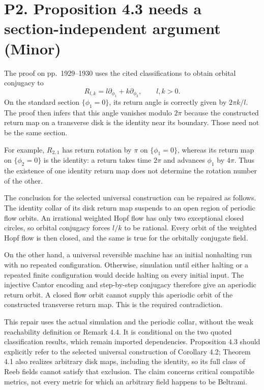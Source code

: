\documentclass[10pt]{article}
\begin{document}
\section*{P2. Proposition 4.3 needs a section-independent argument (Minor)}
The proof on pp. 1929–1930 uses the cited classifications to obtain orbital conjugacy to \[R_{l,k}=l\partial_{\phi_1}+k\partial_{\phi_2},\qquad l,k>0.\] On the standard section \(\{\phi_1=0\}\), its return angle is correctly given by \(2\pi k/l\). The proof then infers that this angle vanishes modulo \(2\pi\) because the constructed return map on a transverse disk is the identity near its boundary. Those need not be the same section.\par
For example, \(R_{2,1}\) has return rotation by \(\pi\) on \(\{\phi_1=0\}\), whereas its return map on \(\{\phi_2=0\}\) is the identity: a return takes time \(2\pi\) and advances \(\phi_1\) by \(4\pi\). Thus the existence of one identity return map does not determine the rotation number of the other.\par
The conclusion for the selected universal construction can be repaired as follows. The identity collar of its disk return map suspends to an open region of periodic flow orbits. An irrational weighted Hopf flow has only two exceptional closed circles, so orbital conjugacy forces \(l/k\) to be rational. Every orbit of the weighted Hopf flow is then closed, and the same is true for the orbitally conjugate field.\par
On the other hand, a universal reversible machine has an initial nonhalting run with no repeated configuration. Otherwise, simulation until either halting or a repeated finite configuration would decide halting on every initial input. The injective Cantor encoding and step-by-step conjugacy therefore give an aperiodic return orbit. A closed flow orbit cannot supply this aperiodic orbit of the constructed transverse return map. This is the required contradiction.\par
This repair uses the actual simulation and the periodic collar, without the weak reachability definition or Remark 4.4. It is conditional on the two quoted classification results, which remain imported dependencies. Proposition 4.3 should explicitly refer to the selected universal construction of Corollary 4.2; Theorem 4.1 also realizes arbitrary disk maps, including the identity, so its full class of Reeb fields cannot satisfy that exclusion. The claim concerns critical compatible metrics, not every metric for which an arbitrary field happens to be Beltrami.\par
\end{document}
